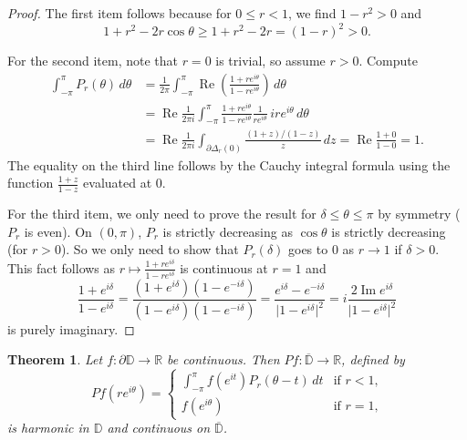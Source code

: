 \documentclass[12pt,openany]{book}
\newcommand{\glsadd}[2][]{}
\renewcommand{\Re}{\operatorname{Re}}
\renewcommand{\Im}{\operatorname{Im}}
\newcommand{\sabs}[1]{\lvert {#1} \rvert}
\newcommand{\R}{{\mathbb{R}}}
\newcommand{\D}{{\mathbb{D}}}
\theoremstyle{plain}
\newtheorem{thm}{Theorem}[section]
\theoremstyle{remark}
\theoremstyle{definition}
\theoremstyle{exercise}
\theoremstyle{example}
\begin{document}
\begin{proof}
The first item follows because
for $0 \leq r < 1$, we find
$1-r^2 > 0$
and
\begin{equation*}
1+r^2-2r \cos\theta \geq 1+r^2-2r = {(1-r)}^2 > 0 .
\end{equation*}

For the second item, note that $r=0$ is trivial, so assume $r > 0$.
Compute
\begin{equation*}
\begin{split}
\int_{-\pi}^{\pi}
P_r(\theta) \, d\theta
& =
\frac{1}{2\pi}
\int_{-\pi}^{\pi}
\Re
\left(
\frac{1+re^{i\theta}}{1-re^{i\theta}}
\right)
\, d\theta
\\
& =
\Re
\frac{1}{2\pi i}
\int_{-\pi}^{\pi}
\frac{1+re^{i\theta}}{1-re^{i\theta}} \frac{1}{re^{i\theta}} \,
ire^{i\theta}
\, d\theta
\\
& = 
\Re
\frac{1}{2\pi i}
\int_{\partial \Delta_r(0)}
\frac{(1+z)/(1-z)}{z} \, dz
=
\Re \frac{1+0}{1-0} = 1 .
\end{split}
\end{equation*}
The equality on the third line follows by the Cauchy integral formula
using the function $\frac{1+z}{1-z}$ evaluated at $0$.

For the third item, we only need to prove the
result for $\delta \leq \theta \leq \pi$ by symmetry ($P_r$ is even).
On $(0,\pi)$, $P_r$ is strictly decreasing as $\cos \theta$ is strictly
decreasing (for $r > 0$).  So we only need to show that $P_r(\delta)$ goes to $0$
as $r \to 1$ if $\delta > 0$.
This fact follows as $r \mapsto
\frac{1+re^{i\delta}}{1-re^{i\delta}}$
is continuous at $r=1$ and
\begin{equation*}
\frac{1+e^{i\delta}}{1-e^{i\delta}}
=
\frac{(1+e^{i\delta})(1-e^{-i\delta})}{(1-e^{i\delta})(1-e^{-i\delta})}
=
\frac{e^{i\delta}-e^{-i\delta}}{\sabs{1-e^{i\delta}}^2}
=
i \frac{2\Im e^{i\delta}}{\sabs{1-e^{i\delta}}^2}
\end{equation*}
is purely imaginary.
\end{proof}

\begin{thm} \label{thm:dirichsol}
Let $f \colon \partial \D \to \R$ be continuous.
Then
$Pf \colon \overline{\D} \to \R$, defined by
\glsadd{not:Pf}%
\begin{equation*}
Pf(re^{i\theta})
=
\begin{cases}
\int_{-\pi}^\pi f(e^{it}) P_{r}(\theta-t) \, dt
&
\text{if $r < 1$,} \\
f(e^{i\theta}) & \text{if $r=1$,}
\end{cases}
\end{equation*}
is harmonic in $\D$ and continuous on $\overline{\D}$.
\end{thm}
\end{document}
